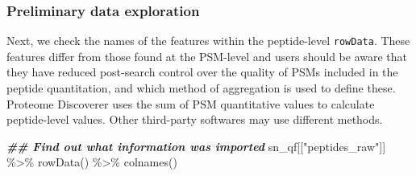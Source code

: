 \documentclass[9pt,a4paper,]{extarticle}
\newenvironment{Shaded}{\begin{snugshade}}{\end{snugshade}}
\newcommand{\DocumentationTok}[1]{\textcolor[rgb]{0.56,0.35,0.01}{\textbf{\textit{#1}}}}
\newcommand{\FunctionTok}[1]{\textcolor[rgb]{0.00,0.00,0.00}{#1}}
\newcommand{\NormalTok}[1]{#1}
\newcommand{\SpecialCharTok}[1]{\textcolor[rgb]{0.00,0.00,0.00}{#1}}
\newcommand{\StringTok}[1]{\textcolor[rgb]{0.31,0.60,0.02}{#1}}
\begin{document}
\hypertarget{preliminary-data-exploration-1}{%
\subsubsection{Preliminary data exploration}\label{preliminary-data-exploration-1}}

Next, we check the names of the features within the peptide-level \texttt{rowData}.
These features differ from those found at the PSM-level and users should be
aware that they have reduced post-search control over the quality of PSMs
included in the peptide quantitation, and which method of aggregation is used to
define these. Proteome Discoverer uses the sum of PSM quantitative values to
calculate peptide-level values. Other third-party softwares may use different
methods.

\begin{Shaded}
\begin{Highlighting}[]
\DocumentationTok{\#\# Find out what information was imported}
\NormalTok{sn\_qf[[}\StringTok{"peptides\_raw"}\NormalTok{]] }\SpecialCharTok{\%\textgreater{}\%}
  \FunctionTok{rowData}\NormalTok{() }\SpecialCharTok{\%\textgreater{}\%}
  \FunctionTok{colnames}\NormalTok{()}
\end{Highlighting}
\end{Shaded}
\end{document}
